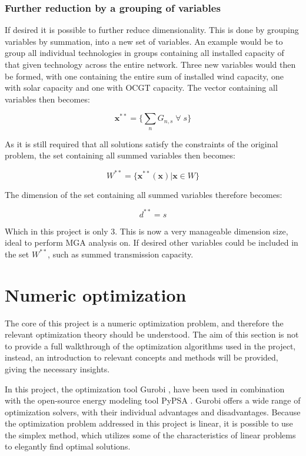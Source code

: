 \subsubsection{Further reduction by a grouping of variables}
If desired it is possible to further reduce dimensionality. This is done by grouping variables by summation, into a new set of variables. An example would be to group all individual technologies in groups containing all installed capacity of that given technology across the entire network. Three new variables would then be formed, with one containing the entire sum of installed wind capacity, one with solar capacity and one with OCGT capacity. The vector containing all variables then becomes: 

\begin{equation}\label{eq:Optimization_variables_3}
\mathbf{x}^{**} = \{  \sum_n G_{n,s} \; \forall \; s \}
\end{equation}

As it is still required that all solutions satisfy the constraints of the original problem, the set containing all summed variables then becomes: 

\begin{equation}
W^{**} = \{ \mathbf{x}^{**}(\mathbf{x})  | \mathbf{x} \in W \}
\end{equation}

The dimension of the set containing all summed variables therefore becomes: 

\begin{equation} \label{eq:dim_d**}
d^{**} = s
\end{equation}

Which in this project is only $3$. This is now a very manageable dimension size, ideal to perform MGA analysis on. If desired other variables could be included in the set $W^{**}$, such as summed transmission capacity. 


\section{Numeric optimization}
The core of this project is a numeric optimization problem, and therefore the relevant optimization theory should be understood. The aim of this section is not to provide a full walkthrough of the optimization algorithms used in the project, instead, an introduction to relevant concepts and methods will be provided, giving the necessary insights. 

In this project, the optimization tool Gurobi \cite{Gurobi}, have been used in combination with the open-source energy modeling tool PyPSA \cite{Pypsa}. Gurobi offers a wide range of optimization solvers, with their individual advantages and disadvantages. Because the optimization problem addressed in this project is linear, it is possible to use the simplex method, which utilizes some of the characteristics of linear problems to elegantly find optimal solutions. 

